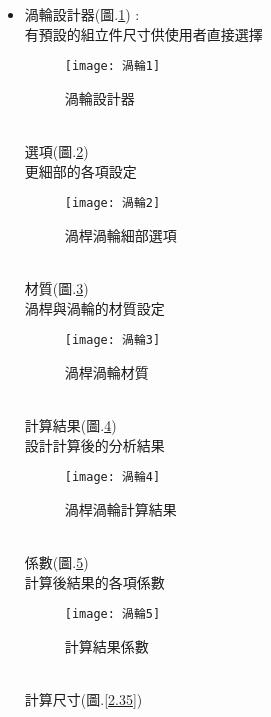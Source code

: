 \begin{itemize}
\newpage	
	
	\item 渦輪設計器(圖.\ref{2.30}) :\\
		\qquad 有預設的組立件尺寸供使用者直接選擇\\
		\begin{figure}[hbt!]
		\begin{center}
		\texttt{[image: 渦輪1]}
		\caption{\Large 渦輪設計器}\label{2.30}
		\end{center}
		\end{figure}
		\\
		選項(圖.\ref{2.31}) \\
		\qquad 更細部的各項設定\\
		\begin{figure}[hbt!]
		\begin{center}
		\texttt{[image: 渦輪2]}
		\caption{\Large 渦桿渦輪細部選項}\label{2.31}
		\end{center}
		\end{figure}
		\\
		材質(圖.\ref{2.32}) \\
		\qquad 渦桿與渦輪的材質設定\\
		\begin{figure}[hbt!]
		\begin{center}
		\texttt{[image: 渦輪3]}
		\caption{\Large 渦桿渦輪材質}\label{2.32}
		\end{center}
		\end{figure}
		\\
		計算結果(圖.\ref{2.33}) \\
		\qquad 設計計算後的分析結果\\
		\begin{figure}[hbt!]
		\begin{center}
		\texttt{[image: 渦輪4]}
		\caption{\Large 渦桿渦輪計算結果}\label{2.33}
		\end{center}
		\end{figure}
		\\
		係數(圖.\ref{2.34}) \\
		\qquad 計算後結果的各項係數\\
		\begin{figure}[hbt!]
		\begin{center}
		\texttt{[image: 渦輪5]}
		\caption{\Large 計算結果係數}\label{2.34}
		\end{center}
		\end{figure}
		\\
		計算尺寸(圖.\ref{2.35}) \\

\end{itemize}
